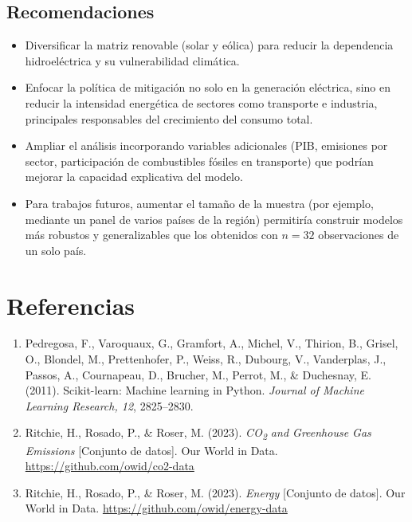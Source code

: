 \documentclass[11pt]{article}
\begin{document}
\subsection*{Recomendaciones}
\begin{itemize}[leftmargin=1.2cm]
    \item Diversificar la matriz renovable (solar y eólica) para reducir la dependencia hidroeléctrica y su vulnerabilidad climática.
    \item Enfocar la política de mitigación no solo en la generación eléctrica, sino en reducir la intensidad energética de sectores como transporte e industria, principales responsables del crecimiento del consumo total.
    \item Ampliar el análisis incorporando variables adicionales (PIB, emisiones por sector, participación de combustibles fósiles en transporte) que podrían mejorar la capacidad explicativa del modelo.
    \item Para trabajos futuros, aumentar el tamaño de la muestra (por ejemplo, mediante un panel de varios países de la región) permitiría construir modelos más robustos y generalizables que los obtenidos con $n=32$ observaciones de un solo país.
\end{itemize}

\section{Referencias}

\begin{enumerate}[leftmargin=1.2cm]
    \item[] Pedregosa, F., Varoquaux, G., Gramfort, A., Michel, V., Thirion, B., Grisel, O., Blondel, M., Prettenhofer, P., Weiss, R., Dubourg, V., Vanderplas, J., Passos, A., Cournapeau, D., Brucher, M., Perrot, M., \& Duchesnay, E. (2011). Scikit-learn: Machine learning in Python. \textit{Journal of Machine Learning Research, 12}, 2825--2830.
    \item[] Ritchie, H., Rosado, P., \& Roser, M. (2023). \textit{CO\textsubscript{2} and Greenhouse Gas Emissions} [Conjunto de datos]. Our World in Data. \url{https://github.com/owid/co2-data}
    \item[] Ritchie, H., Rosado, P., \& Roser, M. (2023). \textit{Energy} [Conjunto de datos]. Our World in Data. \url{https://github.com/owid/energy-data}
\end{enumerate}
\end{document}
